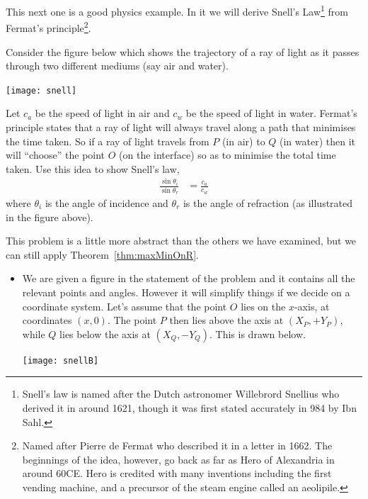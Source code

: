 This next one is a good physics example. In it we will derive Snell's
Law\footnote{Snell's law is named after the Dutch astronomer Willebrord Snellius
who derived it in around 1621, though it was first stated accurately in 984 by
Ibn Sahl.} from Fermat's principle\footnote{Named after Pierre de Fermat who
described it in a letter in 1662. The beginnings of the idea, however, go back
as far as Hero of Alexandria in around 60CE. Hero is credited with many
inventions including the first vending machine, and a precursor of the steam
engine called an aeolipile.}.
\begin{eg}\label{APPglobalMaxMinF}
Consider the figure below which shows the trajectory of a ray of light as it
passes through two different mediums (say air and water).
\begin{efig}
\begin{center}
   \texttt{[image: snell]}
\end{center}
\end{efig}
Let $c_a$ be the speed of light in air and $c_w$ be the speed of
light in water. Fermat's principle states that a ray of light will always
travel along a path that minimises the time taken. So if a ray of light travels
from $P$ (in air) to $Q$ (in water) then it will ``choose'' the point $O$ (on
the interface) so as to minimise the total time taken. Use this idea to show
Snell's law,
\begin{align*}
  \frac{\sin\theta_i}{\sin\theta_r}&=\frac{c_a}{c_w}
\end{align*}
where $\theta_i$ is the angle of incidence and $\theta_r$ is the angle
of refraction (as illustrated in the figure above).


\soln This problem is a little more abstract than the others we have examined,
but we can still apply Theorem~\ref{thm:maxMinOnR}.
\begin{itemize}
 \item We are given a figure in the statement of the problem and it contains
all the relevant points and angles. However it will simplify things if we
decide on a coordinate system. Let's assume that the point $O$ lies on the
$x$-axis, at coordinates $(x,0)$. The point $P$ then lies above the axis at
$(X_P,+Y_P)$, while $Q$ lies below the axis at $(X_Q,-Y_Q)$. This is drawn below.
\begin{efig}
\begin{center}
   \texttt{[image: snellB]}
\end{center}
\end{efig}




\end{itemize}
\end{eg}

